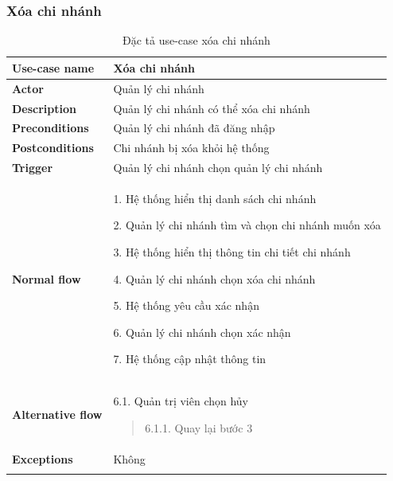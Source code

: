 \subsubsection{Xóa chi nhánh}
{
    \setlength\extrarowheight{6pt}
    \begin{longtable}{| p{} | p{} |}
        \hline
        \textbf{Use-case name}
         &
        Xóa chi nhánh
        \\
        \hline
        \textbf{Actor}
         &
        Quản lý chi nhánh
        \\
        \hline
        \textbf{Description}
         &
        Quản lý chi nhánh có thể xóa chi nhánh
        \\
        \hline
        \textbf{Preconditions}
         &
        Quản lý chi nhánh đã đăng nhập
        \\
        \hline
        \textbf{Postconditions}
         &
        Chi nhánh bị xóa khỏi hệ thống
        \\
        \hline
        \textbf{Trigger}
         &
        Quản lý chi nhánh chọn quản lý chi nhánh
        \\
        \hline
        \begin{flushleft}
            \textbf{Normal flow}
        \end{flushleft}
         &
        1. Hệ thống hiển thị danh sách chi nhánh

        2. Quản lý chi nhánh tìm và chọn chi nhánh muốn xóa

        3. Hệ thống hiển thị thông tin chi tiết chi nhánh

        4. Quản lý chi nhánh chọn xóa chi nhánh

        5. Hệ thống yêu cầu xác nhận

        6. Quản lý chi nhánh chọn xác nhận

        7. Hệ thống cập nhật thông tin
        \\
        \hline
        \begin{flushleft}
            \textbf{Alternative flow}
        \end{flushleft}
         &
        6.1. Quản trị viên chọn hủy
        \begin{quote}
            6.1.1. Quay lại bước 3
        \end{quote}
        \\
        \hline
        \textbf{Exceptions}
         &
        Không
        \\
        \hline
        \caption{Đặc tả use-case xóa chi nhánh}
    \end{longtable}
}

